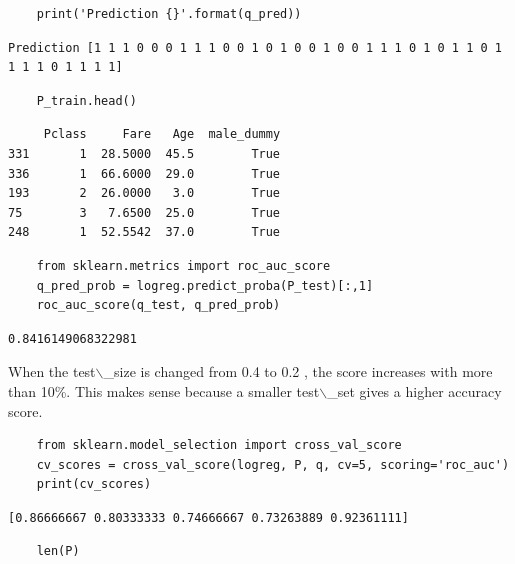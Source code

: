 \documentclass[11pt]{article}
\begin{document}
\begin{verbatim}
    print('Prediction {}'.format(q_pred))
\end{verbatim}

\begin{verbatim}
Prediction [1 1 1 0 0 0 1 1 1 0 0 1 0 1 0 0 1 0 0 1 1 1 0 1 0 1 1 0 1 1 1 1 0 1 1 1 1]

\end{verbatim}

\begin{verbatim}
    P_train.head()
\end{verbatim}

\begin{verbatim}
     Pclass     Fare   Age  male_dummy
331       1  28.5000  45.5        True
336       1  66.6000  29.0        True
193       2  26.0000   3.0        True
75        3   7.6500  25.0        True
248       1  52.5542  37.0        True
\end{verbatim}

\begin{verbatim}
    from sklearn.metrics import roc_auc_score
    q_pred_prob = logreg.predict_proba(P_test)[:,1]
    roc_auc_score(q_test, q_pred_prob)
\end{verbatim}

\begin{verbatim}
0.8416149068322981
\end{verbatim}

When the test$\backslash$\_size is changed from 0.4 to 0.2 , the score increases
with more than 10\%. This makes sense because a smaller test$\backslash$\_set gives a
higher accuracy score.

\begin{verbatim}
    from sklearn.model_selection import cross_val_score
    cv_scores = cross_val_score(logreg, P, q, cv=5, scoring='roc_auc')
    print(cv_scores)
\end{verbatim}

\begin{verbatim}
[0.86666667 0.80333333 0.74666667 0.73263889 0.92361111]

\end{verbatim}

\begin{verbatim}
    len(P)
\end{verbatim}
\end{document}
